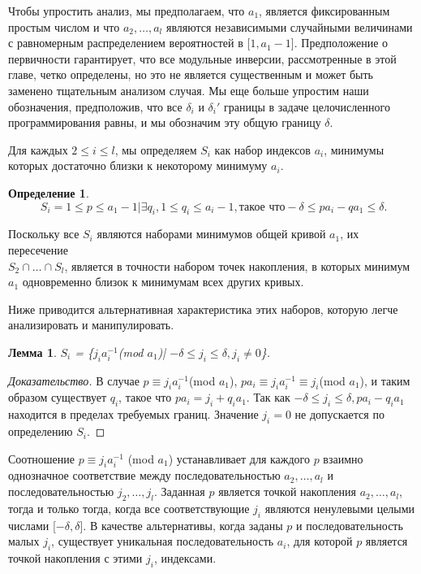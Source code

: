 \documentclass[a4paper,12pt]{report}
\newtheorem{Лемма}{Лемма}
\newtheorem{Определение}{Определение}
\begin{document}
Чтобы упростить анализ, мы предполагаем, что $a_1$, является фиксированным простым числом и что $a_2,\ldots,a_l$ являются независимыми случайными величинами с равномерным распределением вероятностей в [$1, a_1 - 1$]. Предположение о первичности гарантирует, что все модульные инверсии, рассмотренные в этой главе, четко определены, но это не является существенным и может быть заменено тщательным анализом случая. Мы еще больше упростим наши обозначения, предположив, что все $\delta_i$ и $\delta_i'$ границы в задаче целочисленного программирования равны, и мы обозначим эту общую границу $\delta$.

Для каждых $2 \leq i \leq l$, мы определяем $S_i$ как набор индексов $a_i$, минимумы которых достаточно близки к некоторому минимуму $a_i$.

\begin{Определение}
\[
\ S_i = {1 \leq p \leq a_1 - 1| \exists q_i, 1 \leq q_i \leq a_i - 1, \text{такое что} -\delta \leq pa_i - q a_1 \leq \delta}.
\]
\end{Определение}

Поскольку все $S_i$ являются наборами минимумов общей кривой $a_1$, их пересечение \\ $S_2 \cap \ldots \cap S_l$, является в точности набором точек накопления, в которых минимум $a_1$ одновременно близок к минимумам всех других кривых.

Ниже приводится альтернативная характеристика этих наборов, которую легче анализировать и манипулировать.

\begin{Лемма} 
$S_i$ = \{$j_i a_i^{-1}$(mod $a_1$)| $-\delta \leq j_i \leq \delta, j_i \neq 0$\}.
\end{Лемма}

\begin{proof}[Доказательство] 
В случае $p \equiv j_ia_i^{-1}$(mod $a_1$), $pa_i \equiv j_i a_i^{-1} \equiv j_i$(mod $a_1$), и таким образом существует $q_i$, такое что $pa_i = j_i + q_i a_1$. Так как $-\delta \leq j_i \leq \delta , pa_i - q_i a_1$ находится в пределах требуемых границ. Значение $j_i = 0$ не допускается по определению $S_i$.
\end{proof}

Соотношение $p \equiv j_i a_i^{-1}$ (mod $a_1$) устанавливает для каждого $p$ взаимно однозначное соответствие между последовательностью $a_2,\ldots, a_l$ и последовательностью $j_2,\ldots, j_l$. Заданная $p$ является точкой накопления $a_2,\ldots, a_l$, тогда и только тогда, когда все соответствующие $j_i$ являются ненулевыми целыми числами [$-\delta, \delta$]. В качестве альтернативы, когда заданы $p$ и последовательность малых $j_i$, существует уникальная последовательность $a_i$, для которой $p$ является точкой накопления с этими $j_i$, индексами.
\end{document}
